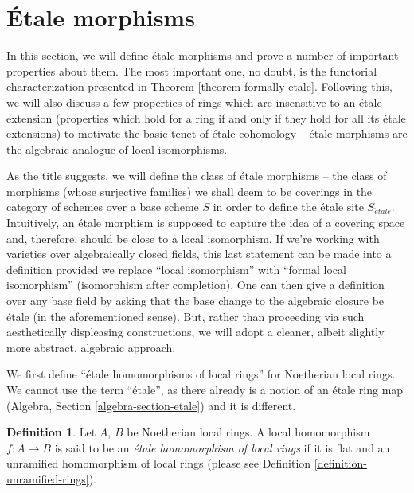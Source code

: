 \documentclass{stacks-project}
\theoremstyle{plain}
\theoremstyle{definition}
\newtheorem{definition}[subsection]{Definition}
\theoremstyle{remark}
\numberwithin{equation}{subsection}
\def\etale{{\acute{e}tale}}
\begin{document}
\section{\'Etale morphisms}
\label{section-etale-morphisms}

\noindent
In this section, we will define \'etale morphisms and prove a number of
important properties about them. The most important one, no doubt, is the
functorial characterization presented in Theorem \ref{theorem-formally-etale}.
Following this, we will also discuss a few properties of rings which are
insensitive to an \'etale extension (properties which hold for a ring
if and only if they hold for all its \'etale extensions) to motivate the basic
tenet of \'etale cohomology -- \'etale morphisms are the algebraic analogue of
local isomorphisms.

\medskip\noindent
As the title suggests, we will define the class of \'etale morphisms -- the
class of morphisms (whose surjective families) we shall deem to be coverings
in the category of schemes over a base scheme $S$ in order to define the
\'etale site $S_\etale$. Intuitively, an \'etale morphism is supposed
to capture the idea of a covering space and, therefore, should be close to a
local isomorphism. If we're working with varieties over algebraically closed
fields, this last statement can be made into a definition provided we replace
``local isomorphism'' with ``formal local isomorphism'' (isomorphism after
completion). One can then give a definition over any base field by asking
that the base change to the algebraic closure be \'etale (in the
aforementioned sense). But, rather than proceeding via such aesthetically
displeasing constructions, we will adopt a cleaner, albeit slightly more
abstract, algebraic approach.

\medskip\noindent
We first define ``\'etale homomorphisms of local rings'' for Noetherian
local rings. We cannot use the term ``\'etale'', as there already
is a notion of an \'etale ring map
(Algebra, Section \ref{algebra-section-etale})
and it is different.

\begin{definition}
\label{definition-etale-ring}
Let $A$, $B$ be Noetherian local rings.
A local homomorphism $f : A \to B$ is said to be an
{\it \'etale homomorphism of local rings}
if it is flat and an unramified homomorphism of local rings
(please see Definition \ref{definition-unramified-rings}).
\end{definition}
\end{document}
